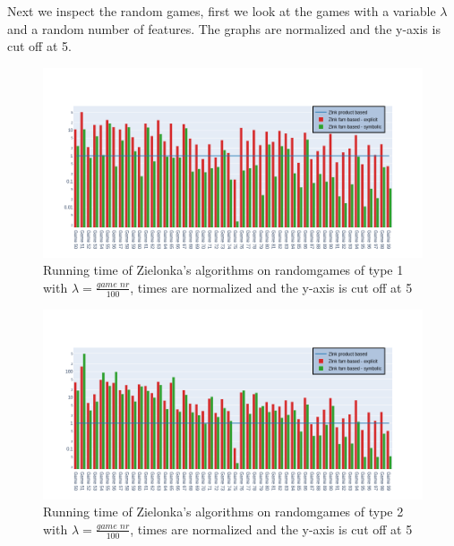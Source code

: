Next we inspect the random games, first we look at the games with a variable $\lambda$ and a random number of features. The graphs are normalized and the y-axis is cut off at 5.
\begin{figure}[H]
\includegraphics[width=1\linewidth]{"results/FF_randomgames/Zlnk product based_Zlnk fam based - explicit_Zlnk fam based - symbolic_"}
\caption{Running time of Zielonka's algorithms on randomgames of type 1 with $\lambda = \frac{\textit{game nr}}{100}$, times are normalized and the y-axis is cut off at 5}
\label{fig:elevatorzlnks}
\end{figure}%
\begin{figure}[H]
\includegraphics[width=1\linewidth]{"results/FC_randomgames/Zlnk product based_Zlnk fam based - explicit_Zlnk fam based - symbolic_"}
\caption{Running time of Zielonka's algorithms on randomgames of type 2 with $\lambda = \frac{\textit{game nr}}{100}$, times are normalized and the y-axis is cut off at 5}
\label{fig:elevatorzlnks}
\end{figure}%
